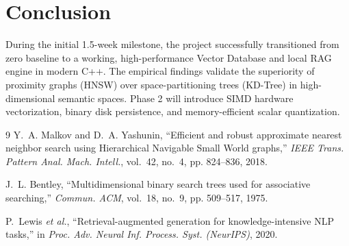 \documentclass[11pt,a4paper]{article}
\begin{document}
\section{Conclusion}
During the initial 1.5-week milestone, the project successfully transitioned from zero baseline to a working, high-performance Vector Database and local RAG engine in modern C++. The empirical findings validate the superiority of proximity graphs (HNSW) over space-partitioning trees (KD-Tree) in high-dimensional semantic spaces. Phase 2 will introduce SIMD hardware vectorization, binary disk persistence, and memory-efficient scalar quantization.

\begin{thebibliography}{9}
Y.~A. Malkov and D.~A. Yashunin, ``Efficient and robust approximate nearest neighbor search using Hierarchical Navigable Small World graphs,'' \emph{IEEE Trans. Pattern Anal. Mach. Intell.}, vol.~42, no.~4, pp. 824--836, 2018.

J.~L. Bentley, ``Multidimensional binary search trees used for associative searching,'' \emph{Commun. ACM}, vol.~18, no.~9, pp. 509--517, 1975.

P.~Lewis \emph{et al.}, ``Retrieval-augmented generation for knowledge-intensive NLP tasks,'' in \emph{Proc. Adv. Neural Inf. Process. Syst. (NeurIPS)}, 2020.
\end{thebibliography}
\end{document}
